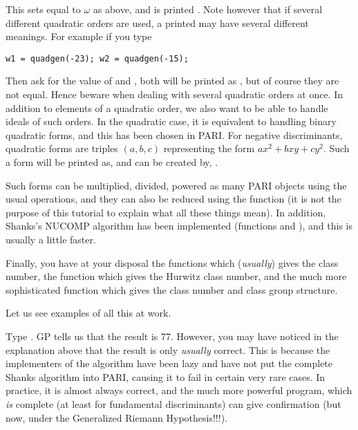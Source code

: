 This sets  equal to $\omega$ as above, and is printed . Note
however that if several different quadratic orders are used, a printed 
may have several different meanings. For example if you type

\centerline{\tt w1 = quadgen(-23); w2 = quadgen(-15);}

Then ask for the value of  and , both will be printed as
, but of course they are not equal. Hence beware when dealing with
several quadratic orders at once. \smallskip
%
In addition to elements of a quadratic order, we also want to be able to
handle ideals of such orders. In the quadratic case, it is equivalent to
handling binary quadratic forms, and this has been chosen in PARI. For
negative discriminants, quadratic forms are triples $(a,b,c)$ representing
the form $ax^2+bxy+cy^2$. Such a form will be printed as, and can be created
by, .

Such forms can be multiplied, divided, powered as many PARI objects using
the usual operations, and they can also be reduced using the function
 (it is not the purpose of this tutorial to explain what all
these things mean). In addition, Shanks's NUCOMP algorithm has been
implemented (functions  and ), and this is
usually a little faster.

Finally, you have at your disposal the functions  which
({\it usually\/}) gives the class number, the function 
which gives the Hurwitz class number, and the much more sophisticated
 function which gives the class number and class group
structure.

Let us see examples of all this at work.

Type . GP tells us that the result is 77. However,
you may have noticed in the explanation above that the result is only
{\it usually\/} correct. This is because the implementers of the algorithm
have been lazy and have not put the complete Shanks algorithm into PARI,
causing it to fail in certain very rare cases. In practice, it is almost
always correct, and the much more powerful  program, which
{\it is} complete (at least for fundamental discriminants) can give
confirmation (but now, under the Generalized Riemann Hypothesis!!!).

